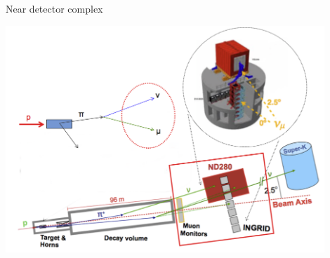 %
%
\begin{frame}{Near detector complex}

  \begin{center}
    \includegraphics[width=0.90\textwidth]{./images/3nu/accelerator/t2k/nd_complex_2}
  \end{center}

\end{frame}


